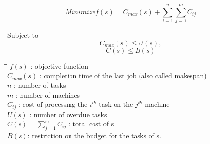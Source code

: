 \[Minimize f(s)=C_{max} (s)+\sum_{i=1}^{n}\sum_{j=1}^{m} C_{ij}\]

Subject to
\[C_{max} (s)\leq U(s),\]
\[C(s) \leq B(s)\]


\begin{tabbing}
\hspace*{2cm}\=\hspace*{3cm}\= \kill
 $ f(s) $\> \textrm{: objective function} \\
 $C_{max}(s)$ \> \textrm{: completion time of the last job (also called makespan)}\\
 $n $ \> \textrm{: number of tasks} \\
 $m $ \> \textrm{: number of machines}\\
 $C_{ij}$\> \textrm{: cost of processing the $i^{th}$ task on the $j^{th}$ machine}\\
 $U(s)$ \>\textrm{: number of overdue tasks}\\
 $C(s) = \sum_{j=1}^{m}C_{ij} $\>\hspace{0.4in}\textrm{ : total cost of s}\\
 $B(s)$\>\textrm{: restriction on the budget for the tasks of s.} 

\end{tabbing}